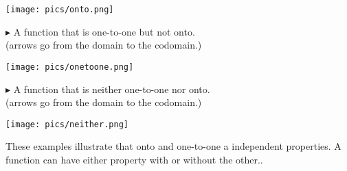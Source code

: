 \documentclass{ximera}
\begin{document}
\begin{image}
\texttt{[image: pics/onto.png]}
\end{image}








$\blacktriangleright$ A function that is one-to-one but not onto.  \\
(arrows go from the domain to the codomain.)

\begin{image}
\texttt{[image: pics/onetoone.png]}
\end{image}







$\blacktriangleright$ A function that is neither one-to-one nor onto.  \\
(arrows go from the domain to the codomain.)

\begin{image}
\texttt{[image: pics/neither.png]}
\end{image}





These examples illustrate that onto and one-to-one a independent properties.  A function can have either property with or without the other..
\end{document}
